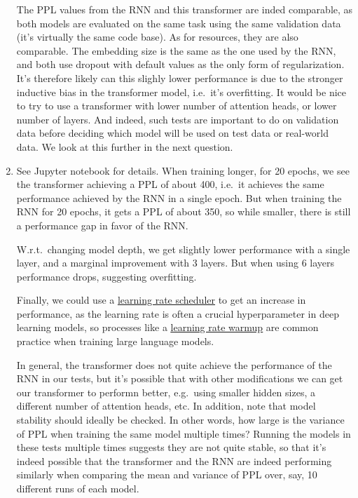 \documentclass[11pt,a4paper]{article}
\begin{document}
\begin{enumerate}[label=(\alph*)]
          The PPL values from the RNN and this transformer are inded comparable,
          as both models are evaluated on the same task using the same
          validation data (it's virtually the same code base).
          As for resources, they are also comparable.
          The embedding size is the same as the one used by the RNN, and both
          use dropout with default values as the only form of regularization.
          It's therefore likely can this slighly lower performance is due to
          the stronger inductive bias in the transformer model, i.e.\ it's
          overfitting.
          It would be nice to try to use a transformer with lower number of
          attention heads, or lower number of layers.
          And indeed, such tests are important to do on validation data before
          deciding which model will be used on test data or real-world data.
          We look at this further in the next question.
    \item See Jupyter notebook for details.
          When training longer, for 20 epochs, we see the transformer achieving
          a PPL of about 400, i.e.\ it achieves the same performance achieved by
          the RNN in a single epoch.
          But when training the RNN for 20 epochs, it gets a PPL of about 350,
          so while smaller, there is still a performance gap in favor of the
          RNN.

          W.r.t.\ changing model depth, we get slightly lower performance with
          a single layer, and a marginal improvement with 3 layers.
          But when using 6 layers performance drops, suggesting overfitting.

          Finally, we could use a
          \href{https://machinelearningmastery.com/using-learning-rate-schedule-in-pytorch-training/}{\underline{learning rate scheduler}}
          to get an increase in performance, as the learning rate is often a
          crucial hyperparameter in deep learning models, so processes like a
          \href{https://www.baeldung.com/cs/learning-rate-warm-up}{\underline{learning rate warmup}}
          are common practice when training large language models.

          In general, the transformer does not quite achieve the performance of
          the RNN in our tests, but it's possible that with other modifications
          we can get our transformer to performn better, e.g.\ using smaller
          hidden sizes, a different number of attention heads, etc.
          In addition, note that model stability should ideally be checked.
          In other words, how large is the variance of PPL when training the
          same model multiple times?
          Running the models in these tests multiple times suggests they are not
          quite stable, so that it's indeed possible that the transformer and
          the RNN are indeed performing similarly when comparing the mean and
          variance of PPL over, say, 10 different runs of each model.
\end{enumerate}
\end{document}
